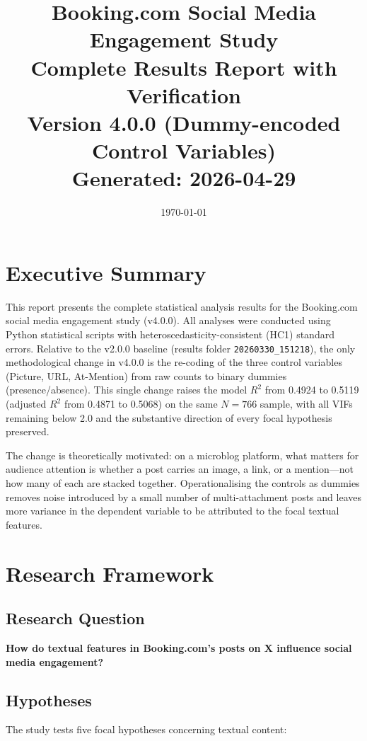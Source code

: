 \documentclass[12pt,a4paper]{article}
\title{Booking.com Social Media Engagement Study\\
Complete Results Report with Verification\\[0.5em]
\large Version 4.0.0 (Dummy-encoded Control Variables)\\[0.3em]
\small Generated: 2026-04-29}
\author{}
\date{\today}
\begin{document}
\maketitle
\tableofcontents
\newpage

\section*{Executive Summary}

This report presents the complete statistical analysis results for the Booking.com social media engagement study (v4.0.0). All analyses were conducted using Python statistical scripts with heteroscedasticity-consistent (HC1) standard errors. Relative to the v2.0.0 baseline (results folder \texttt{20260330\_151218}), the only methodological change in v4.0.0 is the re-coding of the three control variables (Picture, URL, At-Mention) from raw counts to binary dummies (presence/absence). This single change raises the model $R^2$ from 0.4924 to 0.5119 (adjusted $R^2$ from 0.4871 to 0.5068) on the same $N=766$ sample, with all VIFs remaining below 2.0 and the substantive direction of every focal hypothesis preserved.

The change is theoretically motivated: on a microblog platform, what matters for audience attention is whether a post carries an image, a link, or a mention---not how many of each are stacked together. Operationalising the controls as dummies removes noise introduced by a small number of multi-attachment posts and leaves more variance in the dependent variable to be attributed to the focal textual features.

\section{Research Framework}

\subsection{Research Question}
\textbf{How do textual features in Booking.com's posts on X influence social media engagement?}

\subsection{Hypotheses}

The study tests five focal hypotheses concerning textual content:
\end{document}
